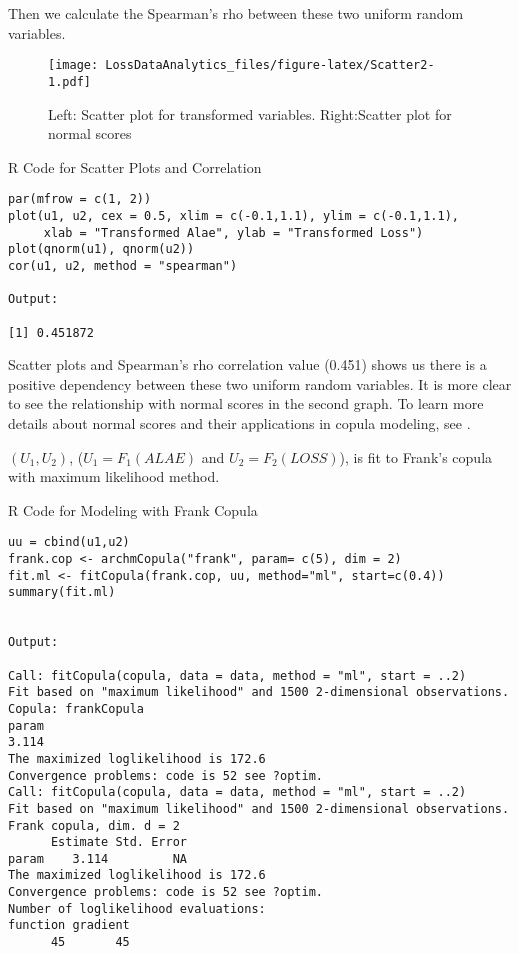 \documentclass[]{book}
\theoremstyle{definition}
\theoremstyle{definition}
\theoremstyle{definition}
\theoremstyle{remark}
\begin{document}
Then we calculate the Spearman's rho between these two uniform random
variables.

\begin{figure}
\centering
\texttt{[image: LossDataAnalytics\_files/figure-latex/Scatter2-1.pdf]}
\caption{\label{fig:Scatter2}Left: Scatter plot for transformed variables.
Right:Scatter plot for normal scores}
\end{figure}

R Code for Scatter Plots and Correlation

\hypertarget{display.Cor.2}{}
\begin{verbatim}
par(mfrow = c(1, 2))
plot(u1, u2, cex = 0.5, xlim = c(-0.1,1.1), ylim = c(-0.1,1.1),
     xlab = "Transformed Alae", ylab = "Transformed Loss")
plot(qnorm(u1), qnorm(u2))
cor(u1, u2, method = "spearman")

Output: 

[1] 0.451872
\end{verbatim}

Scatter plots and Spearman's rho correlation value (0.451) shows us
there is a positive dependency between these two uniform random
variables. It is more clear to see the relationship with normal scores
in the second graph. To learn more details about normal scores and their
applications in copula modeling, see \citep{joe2014dependence}.

\((U_1, U_2)\), (\(U_1 = F_1(ALAE)\) and \(U_2=F_2(LOSS)\)), is fit to
Frank's copula with maximum likelihood method.

R Code for Modeling with Frank Copula

\hypertarget{display.FrankCopula.2}{}
\begin{verbatim}
uu = cbind(u1,u2) 
frank.cop <- archmCopula("frank", param= c(5), dim = 2)
fit.ml <- fitCopula(frank.cop, uu, method="ml", start=c(0.4))
summary(fit.ml)


Output: 

Call: fitCopula(copula, data = data, method = "ml", start = ..2)
Fit based on "maximum likelihood" and 1500 2-dimensional observations.
Copula: frankCopula 
param 
3.114 
The maximized loglikelihood is 172.6 
Convergence problems: code is 52 see ?optim.
Call: fitCopula(copula, data = data, method = "ml", start = ..2)
Fit based on "maximum likelihood" and 1500 2-dimensional observations.
Frank copula, dim. d = 2 
      Estimate Std. Error
param    3.114         NA
The maximized loglikelihood is 172.6 
Convergence problems: code is 52 see ?optim.
Number of loglikelihood evaluations:
function gradient 
      45       45 
\end{verbatim}
\end{document}
